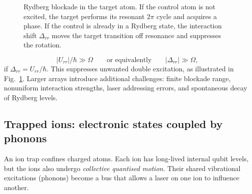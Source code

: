 \begin{figure}[t]
\centering
{}
\caption{Rydberg blockade in the target atom. If the control atom is not excited, the target performs its resonant $2\pi$ cycle and acquires a phase. If the control is already in a Rydberg state, the interaction shift $\Delta_{rr}$ moves the target transition off resonance and suppresses the rotation.}
\label{fig:rydberg}
\end{figure}
\begin{equation}\label{eq:blockade}
|U_{rr}|/\hbar\gg\Omega
\qquad\text{or equivalently}\qquad |\Delta_{rr}|\gg\Omega,
\end{equation}
if $\Delta_{rr}=U_{rr}/\hbar$. This suppresses unwanted double excitation, as illustrated in Fig.~\ref{fig:rydberg}. Larger arrays introduce additional challenges: finite blockade range, nonuniform interaction strengths, laser addressing errors, and spontaneous decay of Rydberg levels.

\subsection{Trapped ions: electronic states coupled by phonons}
An ion trap confines charged atoms. Each ion has long-lived internal qubit levels, but the ions also undergo \emph{collective quantised motion}. Their shared vibrational excitations (phonons) become a bus that allows a laser on one ion to influence another.

